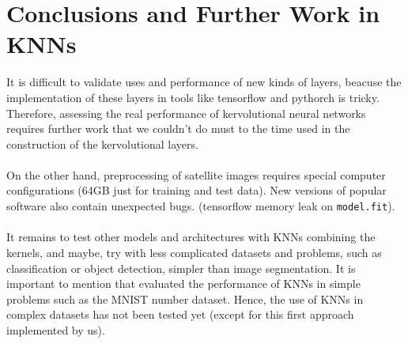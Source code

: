 \documentclass{article}
\begin{document}
\section{Conclusions and Further Work in KNNs}
It is difficult to validate uses and performance of new kinds of layers, beacuse the implementation of these layers in tools like tensorflow and pythorch is tricky.
Therefore, assessing the real performance of kervolutional neural networks requires further work that we couldn't do must to the time used in the construction of the kervolutional layers.\\
\\
On the other hand, preprocessing of satellite images requires special computer configurations (64GB just for training and test data). New versions of popular software also contain unexpected bugs. (tensorflow memory leak on \texttt{model.fit}).\\
\\
It remains to test other models and architectures with KNNs combining the kernels, and maybe, try with less complicated datasets and problems, such as classification or object detection, simpler than image segmentation. It is important to mention that \cite{DBLP:journals/corr/abs-1904-03955} evaluated the performance of KNNs in simple problems such as the MNIST number dataset. Hence, the use of KNNs in complex datasets has not been tested yet (except for this first approach implemented by us).
    

\newpage



\end{document}
